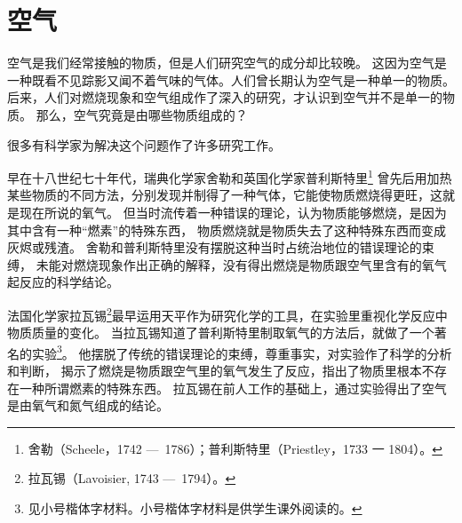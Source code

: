 \section{空气}\label{sec:1-1}

空气是我们经常接触的物质，但是人们研究空气的成分却比较晚。
这因为空气是一种既看不见踪影又闻不着气味的气体。人们曾长期认为空气是一种单一的物质。
后来，人们对燃烧现象和空气组成作了深入的研究，才认识到空气并不是单一的物质。
那么，空气究竟是由哪些物质组成的？

很多有科学家为解决这个问题作了许多研究工作。

早在十八世纪七十年代，瑞典化学家舍勒和英国化学家普利斯特里\footnote{舍勒（Scheele，1742 —\, 1786）；普利斯特里（Priestley，1733 一 1804）。}%
曾先后用加热某些物质的不同方法，分别发现并制得了一种气体，它能使物质燃烧得更旺，这就是现在所说的氧气。
但当时流传着一种错误的理论，认为物质能够燃烧，是因为其中含有一种“燃素”的特殊东西，
物质燃烧就是物质失去了这种特殊东西而变成灰烬或残渣。
舍勒和普利斯特里没有摆脱这种当时占统治地位的错误理论的束缚，
未能对燃烧现象作出正确的解释，没有得出燃烧是物质跟空气里含有的氧气起反应的科学结论。

法国化学家拉瓦锡\footnote{拉瓦锡（Lavoisier, 1743 —\, 1794）。}最早运用天平作为研究化学的工具，在实验里重视化学反应中物质质量的变化。
当拉瓦锡知道了普利斯特里制取氧气的方法后，就做了一个著名的实验\footnote{见小号楷体字材料。小号楷体字材料是供学生课外阅读的。}。
他摆脱了传统的错误理论的束缚，尊重事实，对实验作了科学的分析和判断，
揭示了燃烧是物质跟空气里的氧气发生了反应，指出了物质里根本不存在一种所谓燃素的特殊东西。
拉瓦锡在前人工作的基础上，通过实验得出了空气是由氧气和氮气组成的结论。

